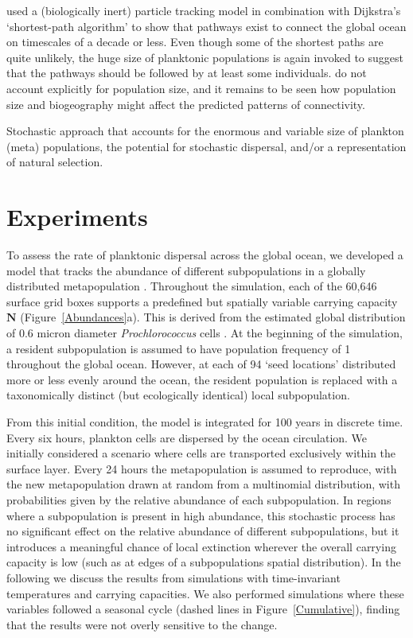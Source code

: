 \documentclass[12pt]{article}
\begin{document}
\citet{Jonsson:2016} used a (biologically inert) particle tracking model in combination with Dijkstra's `shortest-path algorithm' \citet[][]{Dijkstra:1959} to show that pathways exist to connect the global ocean on timescales of a decade or less. Even though some of the shortest paths are quite unlikely, the huge size of planktonic populations is again invoked to suggest that the pathways should be followed by at least some individuals.  \citet{Jonsson:2016} do not account explicitly for population size, and it remains to be seen how population size and biogeography might affect the predicted patterns of connectivity.


Stochastic approach that accounts for the enormous and variable size of plankton (meta) populations, the potential for stochastic dispersal, and/or a representation of natural selection.

\section{Experiments}

To assess the rate of planktonic dispersal across the global ocean, we developed a model that tracks the abundance of different subpopulations in a globally distributed metapopulation \citep{Cherry:2003}. Throughout the simulation, each of the 60,646 surface grid boxes supports a predefined but spatially variable carrying capacity $\mathbf{N}$ (Figure~\ref{Abundances}a). This is derived from the estimated global distribution of 0.6 micron diameter \textit{Prochlorococcus} cells \citep{Dutkiewicz:2019}. At the beginning of the simulation, a resident subpopulation is assumed to have population frequency of 1 throughout the global ocean. However, at each of 94 `seed locations' distributed more or less evenly around the ocean, the resident population is replaced with a taxonomically distinct (but ecologically identical) local subpopulation. 

From this initial condition, the model is integrated for 100 years in discrete time. Every six hours, plankton cells are dispersed by the ocean circulation. We initially considered a scenario where cells are transported exclusively within the surface layer. Every 24 hours the metapopulation is assumed to reproduce, with the new metapopulation drawn at random from a multinomial distribution, with probabilities given by the relative abundance of each subpopulation. In regions where a subpopulation is present in high abundance, this stochastic process has no significant effect on the relative abundance of different subpopulations, but it introduces a meaningful chance of local extinction wherever the overall carrying capacity is low (such as at edges of a subpopulations spatial distribution). In the following we discuss the results from simulations with time-invariant temperatures and carrying capacities. We also performed simulations where these variables followed a seasonal cycle (dashed lines in Figure~\ref{Cumulative}), finding that the results were not overly sensitive to the change.
\end{document}
